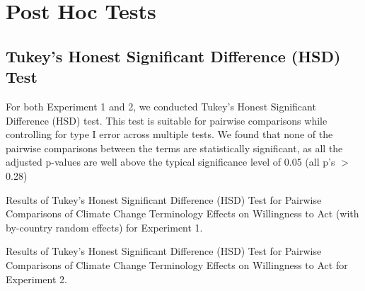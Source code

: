        \section{Post Hoc Tests}

    \subsection{Tukey’s Honest Significant Difference (HSD) Test}

For both Experiment 1 and 2, we conducted Tukey’s Honest Significant Difference (HSD) test. This test is suitable for pairwise comparisons while controlling for type I error across multiple tests. We found that none of the pairwise comparisons between the terms are statistically significant, as all the adjusted p-values are well above the typical significance level of 0.05 (all p’s $>$ 0.28)

\begin{table}[H] 
\caption{Results of Tukey’s Honest Significant Difference (HSD) Test for Pairwise Comparisons of Climate Change Terminology Effects on Willingness to Act (with by-country random effects) for Experiment 1.}
 
\end{table}

\begin{table}[H] 
\caption{Results of Tukey’s Honest Significant Difference (HSD) Test for Pairwise Comparisons of Climate Change Terminology Effects on Willingness to Act for Experiment 2.}
 
\end{table}

